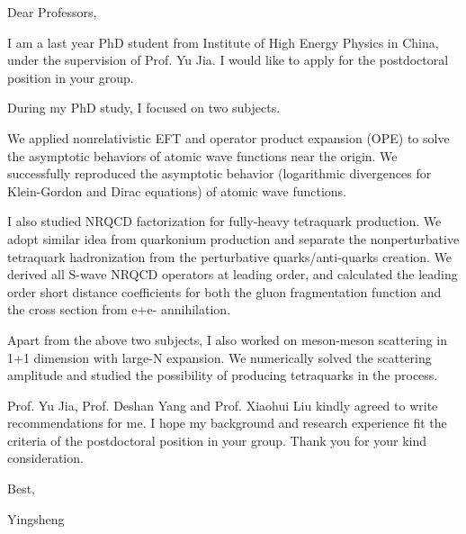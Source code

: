 \documentclass[letterpaper,11pt]{article}
\date{}
\begin{document}
\setlength{\parskip}{2ex}
\setlength{\parindent}{0ex}

Dear Professors,

I am a last year PhD student from Institute of High Energy Physics in China, under the supervision of Prof. Yu Jia. I would like to apply for the postdoctoral position in your group. 

During my PhD study, I focused on two subjects.

We applied nonrelativistic EFT and operator product expansion (OPE) to solve the asymptotic behaviors of atomic wave functions near the origin. We successfully reproduced the asymptotic behavior (logarithmic divergences for Klein-Gordon and Dirac equations) of atomic wave functions.

I also studied NRQCD factorization for fully-heavy tetraquark production. We adopt similar idea from quarkonium production and separate the nonperturbative tetraquark hadronization from the perturbative quarks/anti-quarks creation. We derived all S-wave NRQCD operators at leading order, and calculated the leading order short distance coefficients for both the gluon fragmentation function and the cross section from e+e- annihilation.

Apart from the above two subjects, I also worked on meson-meson scattering in 1+1 dimension with large-N expansion. We numerically solved the scattering amplitude and studied the possibility of producing tetraquarks in the process.

Prof. Yu Jia, Prof. Deshan Yang and Prof. Xiaohui Liu kindly agreed to write recommendations for me. I hope my background and research experience fit the criteria of the postdoctoral position in your group. Thank you for your kind consideration.




\noindent Best,

\noindent Yingsheng 
\end{document}
